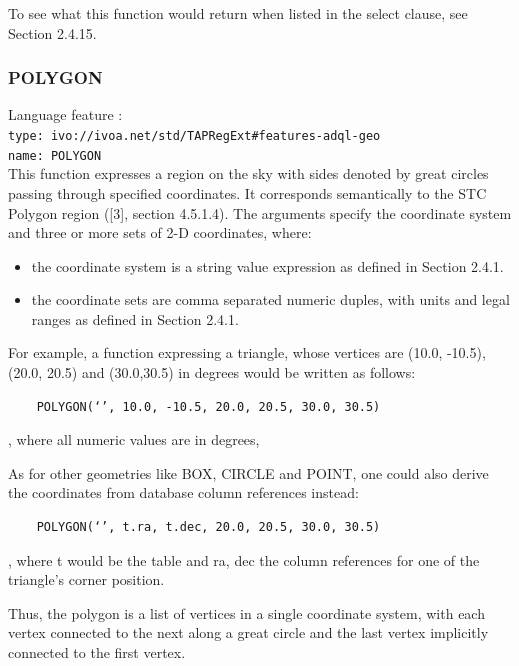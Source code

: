 \documentclass[11pt,a4paper]{ivoa}
\begin{document}
To see what this function would return when listed in the select clause,
see Section 2.4.15.

\subsubsection{POLYGON}
\label{sec:geom.functions.polygon}
{\footnotesize Language feature :}\\
{\footnotesize \verb|type: ivo://ivoa.net/std/TAPRegExt#features-adql-geo|}\\
{\footnotesize \verb|name: POLYGON|}\\

This function expresses a region on the sky with sides denoted by great
circles passing through specified coordinates. It corresponds semantically
to the STC Polygon region ([3], section 4.5.1.4). The arguments specify the
coordinate system and three or more sets of 2-D coordinates, where:

\begin{itemize}
    \item the coordinate system is a string value expression as defined in Section 2.4.1.
    \item the coordinate sets are comma separated numeric duples, with units and legal ranges as defined in Section 2.4.1.
\end{itemize}

For example, a function expressing a triangle, whose vertices are (10.0,
-10.5), (20.0, 20.5) and (30.0,30.5) in degrees would be written
as follows:

\begin{verbatim}
    POLYGON(‘’, 10.0, -10.5, 20.0, 20.5, 30.0, 30.5)
\end{verbatim}
    
, where all numeric values are in degrees,

As for other geometries like BOX, CIRCLE and POINT, one could also derive
the coordinates from database column references instead:

\begin{verbatim}
    POLYGON(‘’, t.ra, t.dec, 20.0, 20.5, 30.0, 30.5)
\end{verbatim}

, where t would be the table and ra, dec the column references for one of
the triangle’s corner position.

Thus, the polygon is a list of vertices in a single coordinate system, with
each vertex connected to the next along a great circle and the last vertex
implicitly connected to the first vertex.
\end{document}
